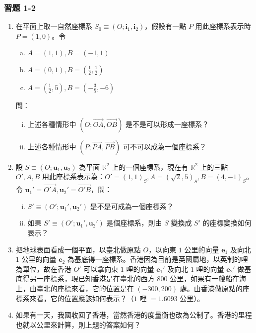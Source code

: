 \subsubsection*{習題 1-2}
\begin{enumerate}
  \item 在平面上取一自然座標系 $S_0 \equiv (O; \mathbf{i}_1, \mathbf{i}_2)$，假設有一點 $P$ 用此座標系表示時 $P = (1, 0)$。令
  \begin{enumerate}[a.]
    \item $A = (1, 1), B = (-1, 1)$
    \item $A = (0, 1), B = (\frac{1}{2}, \frac{1}{2})$
    \item $A = (\frac{1}{2}, 5), B = (-\frac{3}{5}, -6)$
  \end{enumerate}
  問：
  \begin{enumerate}[(i)]
    \item 上述各種情形中 $(O; \vec{OA}, \vec{OB})$ 是不是可以形成一座標系？
    \item 上述各種情形中 $(P; \vec{PA}, \vec{PB})$ 可不可以成為一個座標系？
  \end{enumerate}

  \item 設 $S \equiv (O; \mathbf{u}_1, \mathbf{u}_2)$ 為平面 $\mathbb{R}^2$ 上的一個座標系，現在有 $\mathbb{R}^2$ 上的三點 $O', A, B$ 用此座標系表示為：$O' = (1, 1)_S, A = (\sqrt{2}, 5)_S, B = (4, -1)_S$。令 $\mathbf{u}_1' = \vec{O'A}, \mathbf{u}_2' = \vec{O'B}$，問：
  \begin{enumerate}[(i)]
    \item $S' \equiv (O'; \mathbf{u}_1', \mathbf{u}_2')$ 是不是可成為一個座標系？
    \item 如果 $S' \equiv (O'; \mathbf{u}_1', \mathbf{u}_2')$ 是個座標系，則由 $S$ 變換成 $S'$ 的座標變換如何表示？
  \end{enumerate}

  \item 把地球表面看成一個平面，以臺北做原點 $O$，以向東 $1$ 公里的向量 $\mathbf{e}_1$ 及向北 $1$ 公里的向量 $\mathbf{e}_2$ 為基底得一座標系。香港因為目前是英國屬地，以英制的哩為單位，故在香港 $O'$ 可以拿向東 $1$ 哩的向量 $\mathbf{e}_1'$ 及向北 $1$ 哩的向量 $\mathbf{e}_2'$ 做基底得另一座標系，現已知香港是在臺北的西方 $800$ 公里，如果有一艘船在海上，由臺北的座標來看，它的位置是在 $(-300, 200)$ 處。由香港做原點的座標系來看，它的位置應該如何表示？（$1$ 哩 $= 1.6093$ 公里）。

  \item 如果有一天，我國收回了香港，當然香港的度量衡也改為公制了。香港的里程也就以公里來計算，則上題的答案如何？


\end{enumerate}
